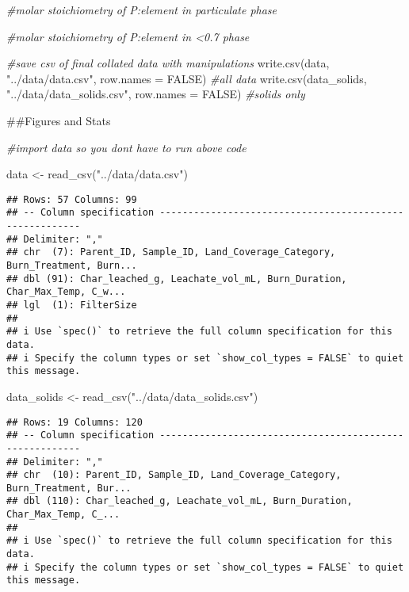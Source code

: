 \documentclass[
]{article}
\newenvironment{Shaded}{\begin{snugshade}}{\end{snugshade}}
\newcommand{\AttributeTok}[1]{\textcolor[rgb]{0.77,0.63,0.00}{#1}}
\newcommand{\CommentTok}[1]{\textcolor[rgb]{0.56,0.35,0.01}{\textit{#1}}}
\newcommand{\ConstantTok}[1]{\textcolor[rgb]{0.00,0.00,0.00}{#1}}
\newcommand{\FunctionTok}[1]{\textcolor[rgb]{0.00,0.00,0.00}{#1}}
\newcommand{\NormalTok}[1]{#1}
\newcommand{\OtherTok}[1]{\textcolor[rgb]{0.56,0.35,0.01}{#1}}
\newcommand{\StringTok}[1]{\textcolor[rgb]{0.31,0.60,0.02}{#1}}
\begin{document}
\begin{Shaded}
\begin{Highlighting}[]
\CommentTok{\#molar stoichiometry of P:element in particulate phase}

\CommentTok{\#molar stoichiometry of P:element in \textless{}0.7 phase}



\CommentTok{\#save csv of final collated data with manipulations}
\FunctionTok{write.csv}\NormalTok{(data, }\StringTok{"../data/data.csv"}\NormalTok{, }\AttributeTok{row.names =} \ConstantTok{FALSE}\NormalTok{) }\CommentTok{\#all data}
\FunctionTok{write.csv}\NormalTok{(data\_solids, }\StringTok{"../data/data\_solids.csv"}\NormalTok{, }\AttributeTok{row.names =} \ConstantTok{FALSE}\NormalTok{) }\CommentTok{\#solids only}
\end{Highlighting}
\end{Shaded}

\#\#Figures and Stats

\begin{Shaded}
\begin{Highlighting}[]
\CommentTok{\#import data so you don\textquotesingle{}t have to run above code}

\NormalTok{data }\OtherTok{\textless{}{-}} \FunctionTok{read\_csv}\NormalTok{(}\StringTok{"../data/data.csv"}\NormalTok{)}
\end{Highlighting}
\end{Shaded}

\begin{verbatim}
## Rows: 57 Columns: 99
## -- Column specification --------------------------------------------------------
## Delimiter: ","
## chr  (7): Parent_ID, Sample_ID, Land_Coverage_Category, Burn_Treatment, Burn...
## dbl (91): Char_leached_g, Leachate_vol_mL, Burn_Duration, Char_Max_Temp, C_w...
## lgl  (1): FilterSize
## 
## i Use `spec()` to retrieve the full column specification for this data.
## i Specify the column types or set `show_col_types = FALSE` to quiet this message.
\end{verbatim}

\begin{Shaded}
\begin{Highlighting}[]
\NormalTok{data\_solids }\OtherTok{\textless{}{-}} \FunctionTok{read\_csv}\NormalTok{(}\StringTok{"../data/data\_solids.csv"}\NormalTok{)}
\end{Highlighting}
\end{Shaded}

\begin{verbatim}
## Rows: 19 Columns: 120
## -- Column specification --------------------------------------------------------
## Delimiter: ","
## chr  (10): Parent_ID, Sample_ID, Land_Coverage_Category, Burn_Treatment, Bur...
## dbl (110): Char_leached_g, Leachate_vol_mL, Burn_Duration, Char_Max_Temp, C_...
## 
## i Use `spec()` to retrieve the full column specification for this data.
## i Specify the column types or set `show_col_types = FALSE` to quiet this message.
\end{verbatim}
\end{document}
